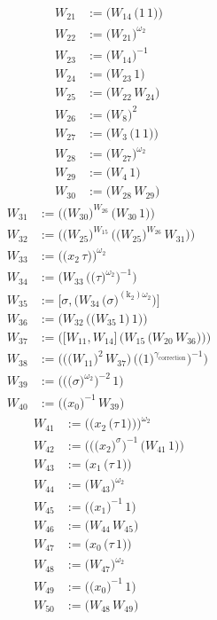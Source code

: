 \begin{align*}
W_{21} &:= \bigl(W_{14}\,\bigl(1\,1\bigr)\bigr) \\
W_{22} &:= \bigl(W_{21}\bigr)^{\omega_2} \\
W_{23} &:= \bigl(W_{14}\bigr)^{-1} \\
W_{24} &:= \bigl(W_{23}\,1\bigr) \\
W_{25} &:= \bigl(W_{22}\,W_{24}\bigr) \\
W_{26} &:= \bigl(W_{8}\bigr)^{2} \\
W_{27} &:= \bigl(W_{3}\,\bigl(1\,1\bigr)\bigr) \\
W_{28} &:= \bigl(W_{27}\bigr)^{\omega_2} \\
W_{29} &:= \bigl(W_{4}\,1\bigr) \\
W_{30} &:= \bigl(W_{28}\,W_{29}\bigr)
\end{align*}
\begin{align*}
W_{31} &:= \bigl(\bigl(W_{30}\bigr)^{W_{26}}\,\bigl(W_{30}\,1\bigr)\bigr) \\
W_{32} &:= \bigl(\bigl(W_{25}\bigr)^{W_{15}}\,\bigl(\bigl(W_{25}\bigr)^{W_{26}}\,W_{31}\bigr)\bigr) \\
W_{33} &:= \bigl(\bigl(x_{2}\,\tau\bigr)\bigr)^{\omega_2} \\
W_{34} &:= \bigl(W_{33}\,\bigl(\bigl(\tau\bigr)^{\omega_2}\bigr)^{-1}\bigr) \\
W_{35} &:= \bigl[\sigma,\bigl(W_{34}\,\bigl(\sigma\bigr)^{(\mathrm{k}_{2})\omega_2}\bigr)\bigr] \\
W_{36} &:= \bigl(W_{32}\,\bigl(\bigl(W_{35}\,1\bigr)\,1\bigr)\bigr) \\
W_{37} &:= \bigl(\bigl[W_{11},W_{14}\bigr]\,\bigl(W_{15}\,\bigl(W_{20}\,W_{36}\bigr)\bigr)\bigr) \\
W_{38} &:= \bigl(\bigl(\bigl(W_{11}\bigr)^{2}\,W_{37}\bigr)\,\bigl(\bigl(1\bigr)^{\gamma_{\mathrm{correction}}}\bigr)^{-1}\bigr) \\
W_{39} &:= \bigl(\bigl(\bigl(\sigma\bigr)^{\omega_2}\bigr)^{-2}\,1\bigr) \\
W_{40} &:= \bigl(\bigl(x_{0}\bigr)^{-1}\,W_{39}\bigr)
\end{align*}
\begin{align*}
W_{41} &:= \bigl(\bigl(x_{2}\,\bigl(\tau\,1\bigr)\bigr)\bigr)^{\omega_2} \\
W_{42} &:= \bigl(\bigl(\bigl(x_{2}\bigr)^{\sigma}\bigr)^{-1}\,\bigl(W_{41}\,1\bigr)\bigr) \\
W_{43} &:= \bigl(x_{1}\,\bigl(\tau\,1\bigr)\bigr) \\
W_{44} &:= \bigl(W_{43}\bigr)^{\omega_2} \\
W_{45} &:= \bigl(\bigl(x_{1}\bigr)^{-1}\,1\bigr) \\
W_{46} &:= \bigl(W_{44}\,W_{45}\bigr) \\
W_{47} &:= \bigl(x_{0}\,\bigl(\tau\,1\bigr)\bigr) \\
W_{48} &:= \bigl(W_{47}\bigr)^{\omega_2} \\
W_{49} &:= \bigl(\bigl(x_{0}\bigr)^{-1}\,1\bigr) \\
W_{50} &:= \bigl(W_{48}\,W_{49}\bigr)
\end{align*}
